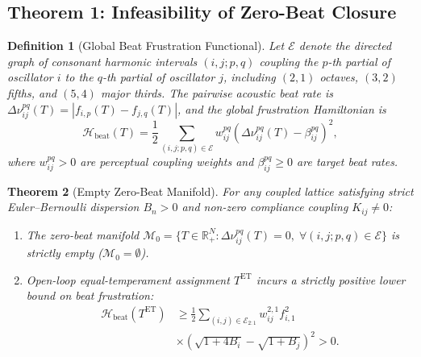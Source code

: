 \documentclass[aps,prl,twocolumn,superscriptaddress,10pt]{revtex4-2}
\newtheorem{theorem}{Theorem}[section]
\newtheorem{definition}[theorem]{Definition}
\begin{document}
\subsection{Theorem 1: Infeasibility of Zero-Beat Closure}

\begin{definition}[Global Beat Frustration Functional]
Let $\mathcal{E}$ denote the directed graph of consonant harmonic intervals $(i,j;p,q)$ coupling the $p$-th partial of oscillator $i$ to the $q$-th partial of oscillator $j$, including $(2,1)$ octaves, $(3,2)$ fifths, and $(5,4)$ major thirds. The pairwise acoustic beat rate is $\Delta\nu_{ij}^{pq}(T) = |f_{i,p}(T) - f_{j,q}(T)|$, and the global frustration Hamiltonian is
\begin{equation}
\mathcal{H}_{\text{beat}}(T) = \frac{1}{2} \sum_{(i,j;p,q) \in \mathcal{E}} w_{ij}^{pq} \left( \Delta\nu_{ij}^{pq}(T) - \beta_{ij}^{pq} \right)^2,
\label{eq:beat_hamiltonian}
\end{equation}
where $w_{ij}^{pq} > 0$ are perceptual coupling weights and $\beta_{ij}^{pq} \ge 0$ are target beat rates.
\end{definition}

\begin{theorem}[Empty Zero-Beat Manifold]
\label{thm:zero_beat_empty}
For any coupled lattice satisfying strict Euler--Bernoulli dispersion $B_n > 0$ and non-zero compliance coupling $K_{ij} \neq 0$:
\begin{enumerate}
\item The zero-beat manifold $\mathcal{M}_0 = \{T \in \mathbb{R}_+^N : \Delta\nu_{ij}^{pq}(T) = 0, \; \forall (i,j;p,q) \in \mathcal{E}\}$ is strictly empty ($\mathcal{M}_0 = \emptyset$).
\item Open-loop equal-temperament assignment $T^{\text{ET}}$ incurs a strictly positive lower bound on beat frustration:
\begin{equation}
\begin{aligned}
\mathcal{H}_{\text{beat}}(T^{\text{ET}}) &\ge \frac{1}{2} \sum_{(i,j)\in\mathcal{E}_{2:1}} w_{ij}^{2,1} f_{i,1}^2 \\
&\times \left( \sqrt{1 + 4 B_i} - \sqrt{1 + B_j} \right)^2 > 0.
\end{aligned}
\label{eq:et_lower_bound}
\end{equation}
\end{enumerate}
\end{theorem}
\end{document}
